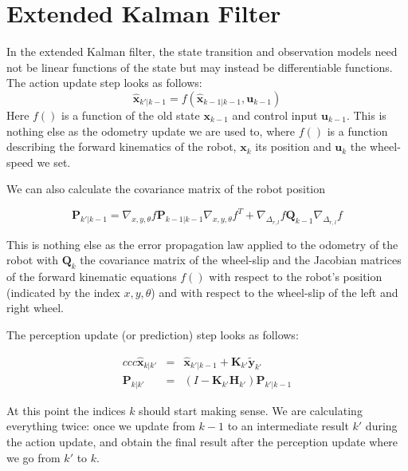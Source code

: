 \section{Extended Kalman Filter}\label{sec:EKF}
In the extended Kalman filter, the state transition and observation models need not be linear functions of the state but may instead be differentiable functions. The action update step looks as follows:
\begin{equation}
\hat{\boldsymbol{x}}_{k'|k-1} = f(\hat{\boldsymbol{x}}_{k-1|k-1}, \boldsymbol{u}_{k-1})
\end{equation}
Here $ f()$ is a function of the old state $ \boldsymbol{x}_{k-1}$ and control input $ \boldsymbol{u}_{k-1}$. This is nothing else as the odometry update we are used to, where $ f()$ is a function describing the forward kinematics of the robot, $ \boldsymbol{x}_k$ its position and $ \boldsymbol{u}_k$ the wheel-speed we set.

We can also calculate the covariance matrix of the robot position

\begin{equation}
\boldsymbol{P}_{k'|k-1} = \nabla_{x,y,\theta}f \boldsymbol{P}_{k-1|k-1}\nabla_{x,y,\theta}f^T + \nabla_{\Delta_{r,l}}f\boldsymbol{Q}_{k-1}\nabla_{\Delta_{r,l}}f
\end{equation}

This is nothing else as the error propagation law applied to the odometry of the robot with $ \boldsymbol{Q}_k$ the covariance matrix of the wheel-slip and the Jacobian matrices of the forward kinematic equations $ f()$ with respect to the robot's position (indicated by the index $ x,y,\theta$) and with respect to the wheel-slip of the left and right wheel.

The perception update (or prediction) step looks as follows:

\begin{eqnarray}{ccc}
\hat{\boldsymbol{x}}_{k|k'} &=& \hat{\boldsymbol{x}}_{k'|k-1} + \boldsymbol{K}_{k'}\tilde{\boldsymbol{y}}_{k'}\\
\boldsymbol{P}_{k|k'} &=& (I - \boldsymbol{K}_{k'} {\boldsymbol{H}_{k'}}) \boldsymbol{P}_{k'|k-1}
\end{eqnarray}

At this point the indices $ k$ should start making sense. We are calculating everything twice: once we update from $ k-1$ to an intermediate result $ k'$ during the action update, and obtain the final result after the perception update where we go from $ k'$ to $ k$.

